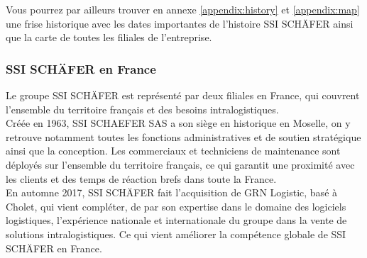 \documentclass[a4paper, 12pt, french]{article}
\begin{document}
				Vous pourrez par ailleurs trouver en annexe \ref{appendix:history} et \ref{appendix:map} une frise historique avec les dates importantes de l'histoire SSI SCHÄFER ainsi que la carte de toutes les filiales de l'entreprise.

			\subsubsection{SSI SCHÄFER en France}
				Le groupe SSI SCHÄFER est représenté par deux filiales en France, qui couvrent l'ensemble du territoire français et des besoins intralogistiques.\\

				Créée en 1963, SSI SCHAEFER SAS a son siège en historique en Moselle, on y retrouve notamment toutes les fonctions administratives et de soutien stratégique ainsi que la conception. Les commerciaux et techniciens de maintenance sont déployés sur l'ensemble du territoire français, ce qui garantit une proximité avec les clients et des temps de réaction brefs dans toute la France.\\

				En automne 2017, SSI SCHÄFER fait l'acquisition de GRN Logistic, basé à Cholet, qui vient compléter, de par son expertise dans le domaine des logiciels logistiques, l'expérience nationale et internationale du groupe dans la vente de solutions intralogistiques. Ce qui vient améliorer la compétence globale de SSI SCHÄFER en France.
			
\end{document}
